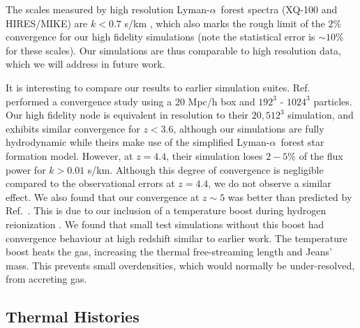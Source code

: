 \documentclass[a4paper,11pt]{article}
\newcommand{\spb}[1]{{\textcolor{magenta}{[{\bf SPB}: #1]}}}
\newcommand{\Lya}{Lyman-$\alpha$}
\begin{document}
The scales measured by high resolution \Lya~forest spectra (XQ-100 and HIRES/MIKE) are $ k < 0.7$ s/km \cite{Irsic:2017}, which also marks the rough limit of the $2\%$ convergence for our high fidelity simulations (note the statistical error is $\sim 10\%$ for these scales). Our simulations are thus comparable to high resolution data, which we will address in future work.

It is interesting to compare our results to earlier simulation suites. Ref.~\cite{Borde:2014} performed a convergence study using a $20$ Mpc/h box and $192^3$ - $1024^3$ particles. Our high fidelity node is equivalent in resolution to their $20, 512^3$ simulation, and exhibits similar convergence for $z < 3.6$, although our simulations are fully hydrodynamic while theirs make use of the simplified \Lya~forest star formation model. However, at $z=4.4$, their simulation loses $2-5\%$ of the flux power for $k > 0.01$ s/km. Although this degree of convergence is negligible compared to the observational errors at $z=4.4$, we do not observe a similar effect.
We also found that our convergence at $z \sim 5$ was better than predicted by Ref.~\cite{2009MNRAS.398L..26B, Bolton:2017}. This is due to our inclusion of a temperature boost during hydrogen reionization \cite{DAloisio:2019}. We found that small test simulations without this boost had convergence behaviour at high redshift similar to earlier work. The temperature boost heats the gas, increasing the thermal free-streaming length and Jeans' mass. This prevents small overdensities, which would normally be under-resolved, from accreting gas.



\subsection{Thermal Histories}
\label{sec:thermal}
\end{document}
